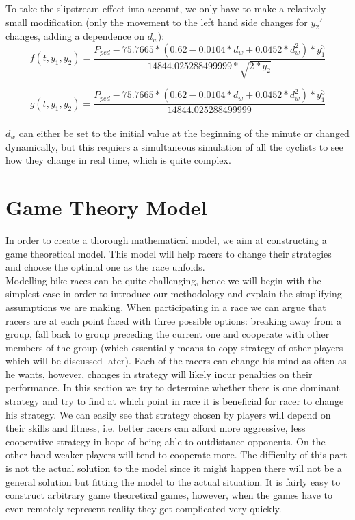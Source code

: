 \documentclass[10pt, a4paper]{report}
\begin{document}
To take the slipstream effect into account, we only have to make a relatively small modification (only the movement to the left hand side changes for $y_2'$ changes, adding a dependence on $d_w$):
$$ f(t, y_1, y_2) = \frac{P_{ped} - 75.7665 * (0.62 - 0.0104*d_w + 0.0452*d_w^2) * y_1 ^ 3}{14844.025288499999 * \sqrt{2 * y_2}}$$

$$ g( t, y_1, y_2 ) = \frac{P_{ped} - 75.7665 * (0.62 - 0.0104*d_w + 0.0452*d_w^2) * y_1 ^ 3}{14844.025288499999}$$ \\

$d_w$ can either be set to the initial value at the beginning of the minute or changed dynamically, but this requiers a simultaneous simulation of all the cyclists to see how they change in real time, which is quite complex.


\section{Game Theory Model}\label{sec:gameth}

In order to create a thorough mathematical model, we aim at constructing a game theoretical model. This model will help racers to change their strategies and choose the optimal one as the race unfolds.\\

Modelling bike races can be quite challenging, hence we will begin with the simplest case in order to introduce our methodology and explain the simplifying assumptions we are making. When participating in a race we can argue that racers are at each point faced with three possible options: breaking away from a group, fall back to group preceding the current one and cooperate with other members of the group (which essentially means to copy strategy of other players - which will be discussed later). Each of the racers can change his mind as often as he wants, however, changes in strategy will likely incur penalties on their performance. In this section we try to determine whether there is one dominant strategy and try to find at which point in race it is beneficial for racer to change his strategy. We can easily see that strategy chosen by players will depend on their skills and fitness, i.e. better racers can afford more aggressive, less cooperative strategy in hope of being able to outdistance opponents. On the other hand weaker players will tend to cooperate more. The difficulty of this part is not the actual solution to the model since it might happen there will not be a general solution but fitting the model to the actual situation. It is fairly easy to construct arbitrary game theoretical games, however, when the games have to even remotely represent reality they get complicated very quickly.\\
\end{document}
